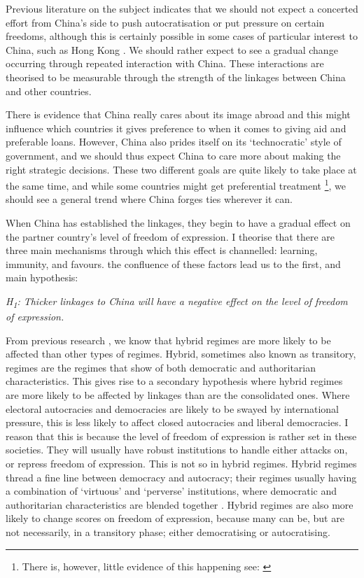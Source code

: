 Previous literature on the subject indicates that we should not expect a concerted effort from China's side to push autocratisation or put pressure on certain freedoms, although this is certainly possible in some cases of particular interest to China, such as Hong Kong \citep{chen_democracy_2015}. We should rather expect to see a gradual change occurring through repeated interaction with China. These interactions are theorised to be measurable through the strength of the linkages between China and other countries.

There is evidence that China really cares about its image abroad and this might influence which countries it gives preference to when it comes to giving aid and preferable loans. However, China also prides itself on its `technocratic' style of government, and we should thus expect China to care more about making the right strategic decisions. These two different goals are quite likely to take place at the same time, and while some countries might get preferential treatment \footnote{There is, however, little evidence of this happening see: \citet{brand_authoritarian_2015}}, we should see a general trend where China forges ties wherever it can.

When China has established the linkages, they begin to have a gradual effect on the partner country's level of freedom of expression. I theorise that there are three main mechanisms through which this effect is channelled: learning, immunity, and favours. the confluence of these factors lead us to the first, and main hypothesis:
\begin{displayquote}
    \textit{H\textsubscript{1}: Thicker linkages to China will have a negative effect on the level of freedom of expression.}  
\end{displayquote}

From previous research \citep{toettoe_foreign_2023}, we know that hybrid regimes are more likely to be affected than other types of regimes. Hybrid, sometimes also known as transitory, regimes are the regimes that show of both democratic and authoritarian characteristics. This gives rise to a secondary hypothesis where hybrid regimes are more likely to be affected by linkages than are the consolidated ones. Where electoral autocracies and democracies are likely to be swayed by international pressure, this is less likely to affect closed autocracies and liberal democracies. I reason that this is because the level of freedom of expression is rather set in these societies. They will usually have robust institutions to handle either attacks on, or repress freedom of expression. This is not so in hybrid regimes. Hybrid regimes thread a fine line between democracy and autocracy; their regimes usually having a combination of `virtuous' and `perverse' institutions, where democratic and authoritarian characteristics are blended together \citep{valenzuela_democratic_1990}. Hybrid regimes are also more likely to change scores on freedom of expression, because many can be, but are not necessarily, in a transitory phase; either democratising or autocratising.

